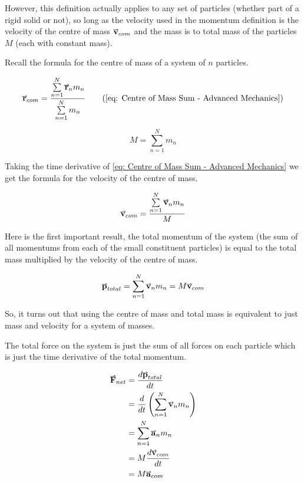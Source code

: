 \documentclass[main.tex]{subfiles}
\begin{document}
                However, this definition actually applies to any set of particles (whether part of a rigid solid or not), so long as the velocity used in the momentum definition is the velocity of the centre of mass $\vect{v}_{com}$ and the mass is to total mass of the particles $M$ (each with constant mass).

                Recall the formula for the centre of mass of a system of $n$ particles.

                \begin{equation*}
                    \vect{r}_{com} = \frac{\sum\limits_{n=1}^N \vect{r}_n m_n}{\sum\limits_{n=1}^N m_n}
                    \tag{\eqnum{eq: Centre of Mass Sum - Advanced Mechanics}}
                \end{equation*}

                \begin{equation*}
                    M = \sum\limits_{n=1}^N m_n
                \end{equation*}

                Taking the time derivative of \eqref{eq: Centre of Mass Sum - Advanced Mechanics} we get the formula for the velocity of the centre of mass.

                \begin{equation*}
                    \vect{v}_{com} = \frac{\sum\limits_{n=1}^N \vect{v}_n m_n}{M}
                \end{equation*}

                Here is the first important result, the total momentum of the system (the sum of all momentums from each of the small constituent particles) is equal to the total mass multiplied by the velocity of the centre of mass.

                \begin{equation}
                    \vect{p}_{total} = \sum\limits_{n=1}^N \vect{v}_n m_n = M\vect{v}_{com}
                \end{equation}

                So, it turns out that using the centre of mass and total mass is equivalent to just mass and velocity for a system of masses.

                The total force on the system is just the sum of all forces on each particle which is just the time derivative of the total momentum.

                \begin{align*}
                    \vect{F}_{net} &= \frac{d\vect{p}_{total}}{dt}\\
                    &= \frac{d}{dt}\left(\sum\limits_{n=1}^N \vect{v}_n m_n\right)\\
                    &= \sum\limits_{n=1}^N \vect{a}_n m_n\\
                    &= M\frac{d\vect{v}_{com}}{dt}\\
                    &= M\vect{a}_{com}
                \end{align*}
\end{document}

